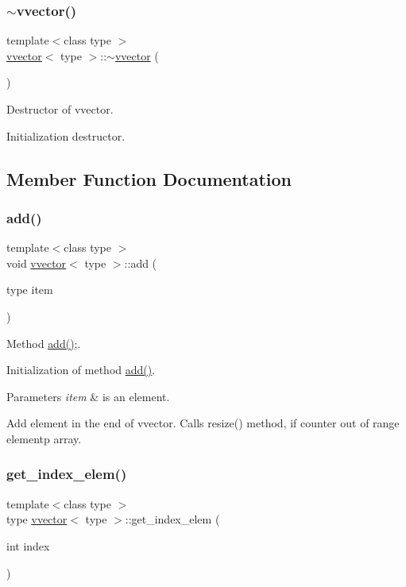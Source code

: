 \subsubsection{\texorpdfstring{$\sim$vvector()}{~vvector()}}
{\footnotesize\ttfamily template$<$class type $>$ \\
\hyperlink{classvvector}{vvector}$<$ type $>$\+::$\sim$\hyperlink{classvvector}{vvector} (\begin{DoxyParamCaption}{ }\end{DoxyParamCaption})}



Destructor of vvector. 

Initialization destructor. 

\subsection{Member Function Documentation}
\mbox{\label{classvvector_a5c8078dbd30a0282fced5d7d252dac7f}} 
\subsubsection{\texorpdfstring{add()}{add()}}
{\footnotesize\ttfamily template$<$class type $>$ \\
void \hyperlink{classvvector}{vvector}$<$ type $>$\+::add (\begin{DoxyParamCaption}\item[{type}]{item }\end{DoxyParamCaption})}



Method \hyperlink{classvvector_a5c8078dbd30a0282fced5d7d252dac7f}{add()};. 

Initialization of method \hyperlink{classvvector_a5c8078dbd30a0282fced5d7d252dac7f}{add()}. 
\begin{DoxyParams}{Parameters}
{\em item} & is an element.\\
\hline
\end{DoxyParams}
Add element in the end of vvector. Calls resize() method, if counter out of range elementp array. \mbox{\label{classvvector_a6df759ba66353840d0b9f915a7c6338c}} 
\subsubsection{\texorpdfstring{get\+\_\+index\+\_\+elem()}{get\_index\_elem()}}
{\footnotesize\ttfamily template$<$class type $>$ \\
type \hyperlink{classvvector}{vvector}$<$ type $>$\+::get\+\_\+index\+\_\+elem (\begin{DoxyParamCaption}\item[{int}]{index }\end{DoxyParamCaption})}



